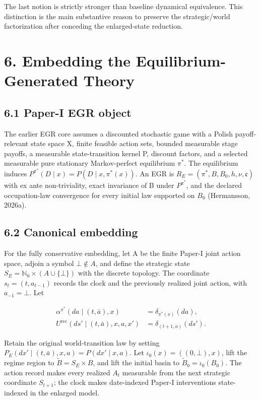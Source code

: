 \documentclass[10pt]{article}
\begin{document}
The last notion is strictly stronger than baseline dynamical
equivalence. This distinction is the main substantive reason to preserve
the strategic/world factorization after conceding the enlarged-state
reduction.

\section{6. Embedding the Equilibrium-Generated
Theory}\label{embedding-the-equilibrium-generated-theory}

\subsection{6.1 Paper-I EGR object}\label{paper-i-egr-object}

The earlier EGR core assumes a discounted stochastic game with a Polish
payoff-relevant state space X, finite feasible action sets, bounded
measurable stage payoffs, a measurable state-transition kernel P,
discount factors, and a selected measurable pure stationary
Markov-perfect equilibrium \(\pi^\ast\). The equilibrium induces
\(P^{\pi^\ast}(D\mid x)=P(D\mid x,\pi^\ast(x))\). An EGR is
\(R_E=(\pi^\ast,B,B_0,h,\nu,\mathfrak c)\) with ex ante non-triviality,
exact invariance of B under \(P^{\pi^\ast}\), and the declared
occupation-law convergence for every initial law supported on \(B_0\)
(Hermansson, 2026a).

\subsection{6.2 Canonical embedding}\label{canonical-embedding}

For the fully conservative embedding, let A be the finite Paper-I joint
action space, adjoin a symbol \(\bot\notin{}A\), and define the
strategic state \(S_E=\mathbb N_0\times{}(A\cup{}\{\bot\})\) with the
discrete topology. The coordinate \(s_t=(t,a_{t-1})\) records the clock
and the previously realized joint action, with \(a_{-1}=\bot\). Let

\begin{equation}
\begin{aligned}\alpha^{\pi^\ast}(da\mid(t,\bar a),x)&=\delta_{\pi^\ast(x)}(da),\\[2pt]U^{\mathrm{rec}}(ds'\mid(t,\bar a),x,a,x')&=\delta_{(t+1,a)}(ds').\end{aligned}
\tag{17}\label{eq:17}
\end{equation}

Retain the original world-transition law by setting
\(P_E(dx'\mid (t,\bar a),x,a)=P(dx'\mid x,a)\). Let
\(\iota_0(x)=((0,\bot),x)\), lift the regime region to
\(\widetilde B=S_E\times{}B\), and lift the initial basin to
\(\widetilde B_0=\iota_0(B_0)\). The action record makes every realized
\(A_t\) measurable from the next strategic coordinate \(S_{t+1}\); the
clock makes date-indexed Paper-I interventions state-indexed in the
enlarged model.
\end{document}
